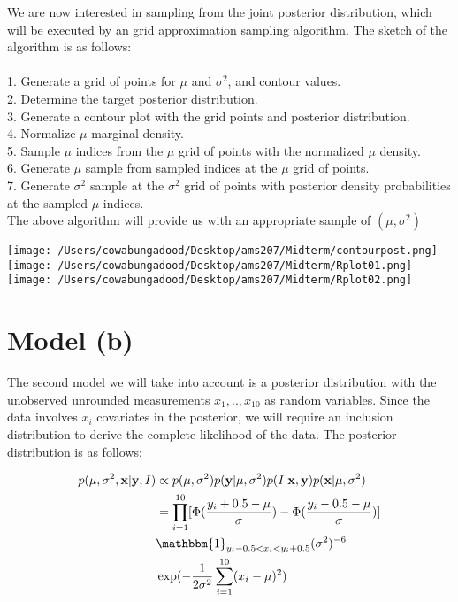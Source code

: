 \documentclass{asaproc}
\begin{document}
We are now interested in sampling from the joint posterior distribution, which will be executed by an grid approximation sampling algorithm.  The sketch of the algorithm is as follows:\\\\
1. Generate a grid of points for $\mu$ and $\sigma^2$, and contour values. \\
2. Determine the target posterior distribution.\\
3. Generate a contour plot with the grid points and posterior distribution. \\
4. Normalize $\mu$ marginal density. \\
5. Sample $\mu$ indices from the $\mu$ grid of points with the normalized $\mu$ density. \\
6.  Generate $\mu$ sample from sampled indices at the $\mu$ grid of points. \\
7. Generate $\sigma^2$ sample at the $\sigma^2$ grid of points with posterior density probabilities at the sampled $\mu$ indices.  \\

The above algorithm will provide us with an appropriate sample of $(\mu, \sigma^2)$

\texttt{[image: /Users/cowabungadood/Desktop/ams207/Midterm/contourpost.png]}
\texttt{[image: /Users/cowabungadood/Desktop/ams207/Midterm/Rplot01.png]}
\texttt{[image: /Users/cowabungadood/Desktop/ams207/Midterm/Rplot02.png]}

\section{Model (b)}

The second model we will take into account is a posterior distribution with the unobserved unrounded measurements $x_{1},..,x_{10}$ as random variables.  Since the data involves $x_{i}$ covariates in the posterior, we will require an inclusion distribution to derive the complete likelihood of the data. The posterior distribution is as follows:


\begin{align*}
p(\mu,\sigma^2, \mathbf{x} | \mathbf{y}, I) &\propto p(\mu,\sigma^2)p(\mathbf{y} | \mu,\sigma^2)p(I | \mathbf{x}, \mathbf{y})p(\mathbf{x} | \mu, \sigma^2) \\
&= \prod_{i=1}^{10}[\Phi(\frac{y_{i}+0.5-\mu}{\sigma}) - \Phi(\frac{y_{i}-0.5-\mu}{\sigma})] \\
&\mathbbm{1}_{y_{i}-0.5<x_{i}<y_{i}+0.5}(\sigma^2)^{-6}\\
&\exp(-\frac{1}{2\sigma^2}\sum_{i=1}^{10}(x_{i}-\mu)^2)\\
\end{align*}
\end{document}

